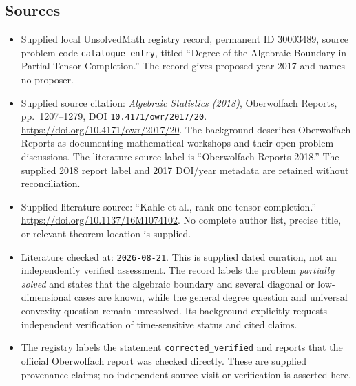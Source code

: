 \documentclass[11pt]{article}
\begin{document}
\subsection{Sources}
\begin{itemize}
\item Supplied local UnsolvedMath registry record, permanent ID \(30003489\), source problem code \texttt{catalogue entry}, titled ``Degree of the Algebraic Boundary in Partial Tensor Completion.'' The record gives proposed year 2017 and names no proposer.
\item Supplied source citation: \emph{Algebraic Statistics (2018)}, Oberwolfach Reports, pp.\ 1207--1279, DOI \texttt{10.4171/owr/2017/20}. \url{https://doi.org/10.4171/owr/2017/20}. The background describes Oberwolfach Reports as documenting mathematical workshops and their open-problem discussions. The literature-source label is ``Oberwolfach Reports 2018.'' The supplied 2018 report label and 2017 DOI/year metadata are retained without reconciliation.
\item Supplied literature source: ``Kahle et al., rank-one tensor completion.'' \url{https://doi.org/10.1137/16M1074102}. No complete author list, precise title, or relevant theorem location is supplied.
\item Literature checked at: \texttt{2026-08-21}. This is supplied dated curation, not an independently verified assessment. The record labels the problem \emph{partially solved} and states that the algebraic boundary and several diagonal or low-dimensional cases are known, while the general degree question and universal convexity question remain unresolved. Its background explicitly requests independent verification of time-sensitive status and cited claims.
\item The registry labels the statement \texttt{corrected\_verified} and reports that the official Oberwolfach report was checked directly. These are supplied provenance claims; no independent source visit or verification is asserted here.
\end{itemize}
\end{document}
